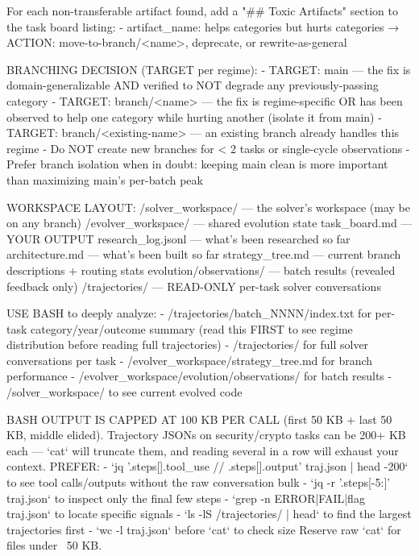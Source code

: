 \begin{promptlisting}[Analyst]
For each non-transferable artifact found, add a "## Toxic Artifacts" section
to the task board listing:
  - artifact_name: helps {categories} but hurts {categories} → ACTION:
    move-to-branch/<name>, deprecate, or rewrite-as-general

BRANCHING DECISION (TARGET per regime):
- TARGET: main — the fix is domain-generalizable AND verified to NOT degrade
  any previously-passing category
- TARGET: branch/<name> — the fix is regime-specific OR has been observed to
  help one category while hurting another (isolate it from main)
- TARGET: branch/<existing-name> — an existing branch already handles this regime
- Do NOT create new branches for < 2 tasks or single-cycle observations
- Prefer branch isolation when in doubt: keeping main clean is more important
  than maximizing main's per-batch peak

WORKSPACE LAYOUT:
  /solver_workspace/          — the solver's workspace (may be on any branch)
  /evolver_workspace/         — shared evolution state
    task_board.md             — YOUR OUTPUT
    research_log.jsonl        — what's been researched so far
    architecture.md           — what's been built so far
    strategy_tree.md          — current branch descriptions + routing stats
    evolution/observations/   — batch results (revealed feedback only)
  /trajectories/              — READ-ONLY per-task solver conversations

USE BASH to deeply analyze:
- /trajectories/batch_NNNN/index.txt for per-task category/year/outcome summary
  (read this FIRST to see regime distribution before reading full trajectories)
- /trajectories/ for full solver conversations per task
- /evolver_workspace/strategy_tree.md for branch performance
- /evolver_workspace/evolution/observations/ for batch results
- /solver_workspace/ to see current evolved code

BASH OUTPUT IS CAPPED AT 100 KB PER CALL (first 50 KB + last 50 KB,
middle elided). Trajectory JSONs on security/crypto tasks can be
200+ KB each — `cat` will truncate them, and reading several in a row
will exhaust your context. PREFER:
  - `jq '.steps[].tool_use // .steps[].output' traj.json | head -200` to
    see tool calls/outputs without the raw conversation bulk
  - `jq -r '.steps[-5:]' traj.json` to inspect only the final few steps
  - `grep -n ERROR|FAIL|flag traj.json` to locate specific signals
  - `ls -lS /trajectories/ | head` to find the largest trajectories first
  - `wc -l traj.json` before `cat` to check size
Reserve raw `cat` for files under ~50 KB.


\end{promptlisting}
